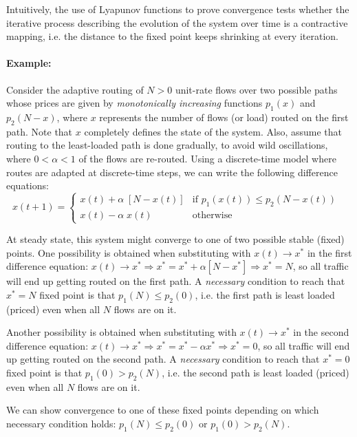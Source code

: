 \documentclass{article}
\begin{document}
Intuitively, the use of Lyapunov functions to prove convergence tests whether the iterative process
describing the evolution of the system over time is a contractive mapping, i.e. 
the distance to the fixed point keeps shrinking at every iteration.

\paragraph{Example:}
Consider the adaptive routing of $N > 0$ unit-rate flows over two possible paths whose prices are given by
{\em monotonically increasing} functions
$p_1(x)$ and $p_2(N-x)$, where $x$ represents the number of flows (or load) routed on the first path.
Note that $x$ completely defines the state of the system.
Also, assume that routing to the least-loaded path is done gradually, to avoid wild oscillations,
where $0 < \alpha < 1$ of the flows are re-routed.
Using a discrete-time model where routes are adapted at discrete-time steps, 
we can write the following difference equations:
$$
x(t+1) = \left\{ \begin{array}{rl} 
               x(t) + \alpha \; [N - x(t)]  & \mbox{if  $p_1(x(t)) \leq p_2(N -  x(t))$ } \\
               x(t) - \alpha \; x(t) & \mbox{otherwise}
                        \end{array} \right.
$$

At steady state, this system might converge to one of two possible stable (fixed) points.
One possibility is obtained when substituting with $x(t) \rightarrow x^*$ in the first difference equation: 
$x(t) \rightarrow x^* \Rightarrow x^* = x^* + \alpha [N - x^*] \Rightarrow x^* = N$, 
so all traffic will end up getting routed on the first path. 
A {\em necessary} condition to reach that $x^* = N$ fixed point is that $p_1(N) \leq p_2(0)$, i.e. 
the first path is least loaded (priced) even when all $N$ flows are on it.

Another possibility is obtained when substituting with $x(t) \rightarrow x^*$ in the second difference equation:
$x(t) \rightarrow x^* \Rightarrow x^* = x^* - \alpha x^* \Rightarrow x^* = 0$, 
so all traffic will end up getting routed on the second path. 
A {\em necessary} condition to reach that $x^* = 0$ fixed point is that $p_1(0) > p_2(N)$, i.e. 
the second path is least loaded (priced) even when all $N$ flows are on it.

We can show convergence to one of these fixed points depending on which necessary condition holds: 
$p_1(N) \leq p_2(0)$ or $p_1(0) > p_2(N)$.
\end{document}
